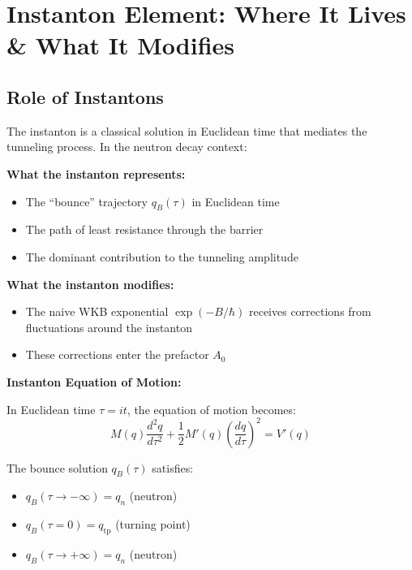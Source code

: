 \documentclass[11pt,a4paper]{article}
\begin{document}
\section{Instanton Element: Where It Lives \& What It Modifies}
\label{sec:instanton}

\subsection{Role of Instantons}

The instanton is a classical solution in Euclidean time that mediates the tunneling process. In the neutron decay context:

\textbf{What the instanton represents:}
\begin{itemize}
    \item The ``bounce'' trajectory $q_B(\tau)$ in Euclidean time
    \item The path of least resistance through the barrier
    \item The dominant contribution to the tunneling amplitude
\end{itemize}

\textbf{What the instanton modifies:}
\begin{itemize}
    \item The naive WKB exponential $\exp(-B/\hbar)$ receives corrections from fluctuations around the instanton
    \item These corrections enter the prefactor $A_0$
\end{itemize}

\begin{derivbox}
\textbf{Instanton Equation of Motion:}

In Euclidean time $\tau = it$, the equation of motion becomes:
\begin{equation}
    M(q) \frac{d^2 q}{d\tau^2} + \frac{1}{2} M'(q) \left( \frac{dq}{d\tau} \right)^2 = V'(q)
    \label{eq:instanton_eom}
\end{equation}

The bounce solution $q_B(\tau)$ satisfies:
\begin{itemize}[nosep]
    \item $q_B(\tau \to -\infty) = q_n$ (neutron)
    \item $q_B(\tau = 0) = q_{\text{tp}}$ (turning point)
    \item $q_B(\tau \to +\infty) = q_n$ (neutron)
\end{itemize}
\end{derivbox}
\end{document}

